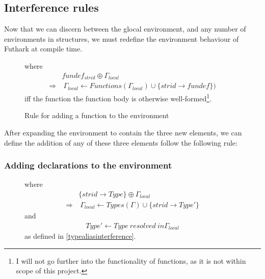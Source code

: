 \subsection{Interference rules}\label{structuresinterferencerules}
Now that we can discern between the glocal environment, and any number of
environments in structures, we must redefine the environment behaviour of Futhark at compile time.
\\
\begin{figure}\label{Rule1}
  \begin{tcolorbox}
    \begin{prooftree}
    \end{prooftree}

    where
	\begin{align*}
                & fundef_{strid} \oplus \Gamma_{local} \\
    \Rightarrow &\ \Gamma_{local} \leftarrow Functions (\Gamma_{local}) \cup \{strid \to
      fundef \})
	\end{align*}
    iff the function the function body is otherwise well-formed\footnote{I will not go further into
      the functionality of functions, as it is not within scope of this project.}.
  \end{tcolorbox}
  \caption{Rule for adding a function to the environment}
\end{figure}

After expanding the environment to contain the three new elements, we can define the
addition of any of these three elements follow the following rule:
\subsubsection{Adding declarations to the environment}\label{normaldecls}
\begin{figure}\label{Rule2type}
  \begin{tcolorbox}
    \begin{prooftree}
    \end{prooftree} where
    \begin{align*}
            & \{ strid \to Type \} \oplus \Gamma_{local} \\ 
\Rightarrow &\ \Gamma_{local} \leftarrow Types(\Gamma) \cup \{strid \to Type'\}
    \end{align*}
     and 
     \begin{align*}
     Type' \leftarrow Type\ resolved\ in \Gamma_{local}
     \end{align*}
     as defined in \ref{typealiasinterference}.
  \end{tcolorbox}
\end{figure}

